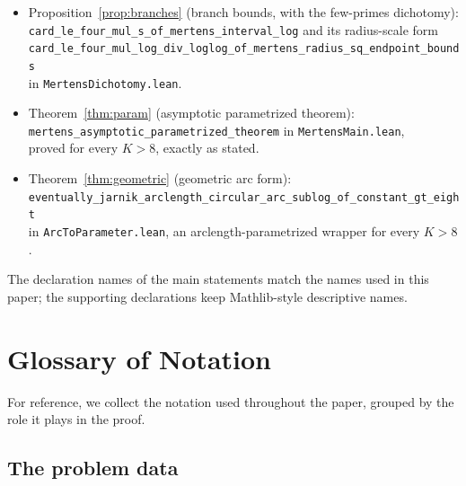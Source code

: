 \documentclass[11pt]{article}
\begin{document}
\begin{itemize}[leftmargin=2em]
\texttt{card\_le\_of\_prime\_divisor\_descent\_branch\_log\_twoScale\_saturated}\\
in \texttt{MertensDichotomy.lean}.
\item Proposition~\ref{prop:branches} (branch bounds, with the few-primes dichotomy):\\
\texttt{card\_le\_four\_mul\_s\_of\_mertens\_interval\_log} and its radius-scale form\\
\texttt{card\_le\_four\_mul\_log\_div\_loglog\_of\_mertens\_radius\_sq\_endpoint\_bounds}\\
in \texttt{MertensDichotomy.lean}.
\item Theorem~\ref{thm:param} (asymptotic parametrized theorem):\\
\texttt{mertens\_asymptotic\_parametrized\_theorem} in \texttt{MertensMain.lean},\\
proved for every \(K>8\), exactly as stated.
\item Theorem~\ref{thm:geometric} (geometric arc form):\\
\texttt{eventually\_jarnik\_arclength\_circular\_arc\_sublog\_of\_constant\_gt\_eight}\\
in \texttt{ArcToParameter.lean}, an arclength-parametrized wrapper for every \(K>8\).
\end{itemize}

The declaration names of the main statements match the names used in this paper; the supporting declarations keep Mathlib-style descriptive names.

\section{Glossary of Notation}
\label{sec:glossary}

For reference, we collect the notation used throughout the paper, grouped by the role it plays in the proof.

\subsection*{The problem data}
\end{document}

